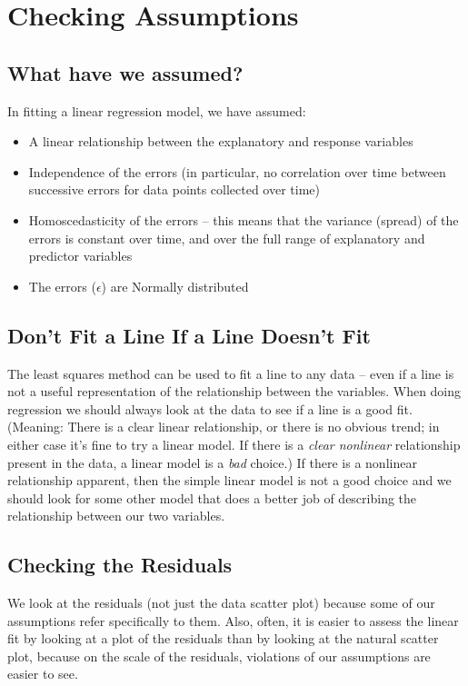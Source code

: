\documentclass[twoside]{book}\usepackage[]{graphicx}\usepackage[]{xcolor}
\begin{document}
\section{Checking Assumptions}
\subsection{What have we assumed?}
In fitting a linear regression model, we have assumed:
\begin{itemize}
\item A linear relationship between the explanatory and response variables
\item Independence of the errors (in particular, no correlation over time between successive errors for data points collected over time)
\item Homoscedasticity of the errors -- this means that the variance (spread) of the errors is constant over time, and over the full range of explanatory and predictor variables
\item The errors ($\epsilon$) are Normally distributed
\end{itemize}

\subsection{Don't Fit a Line If a Line Doesn't Fit}

The least squares method can be used to fit a line to any data -- even if a line
is not a useful representation of the relationship between the variables.
When doing regression we should always look at the data to see if a line 
is a good fit. (Meaning: There is a clear linear relationship, or there is no obvious trend; in either case it's fine to try a linear model.  If there is a \emph{clear nonlinear} relationship present in the data, a linear model is a \emph{bad} choice.)  If there is a nonlinear relationship apparent, then the simple linear model is not a good choice and 
we should look for some other model that does a better job of describing the 
relationship between our two variables.  

\subsection{Checking the Residuals}
We look at the residuals (not just the data scatter plot) because some of our assumptions refer specifically to them.  Also, often, it is easier to assess the linear fit by looking at a plot of the 
residuals than by looking at the natural scatter plot, because on the scale 
of the residuals, violations of our assumptions are easier to see.
\end{document}
